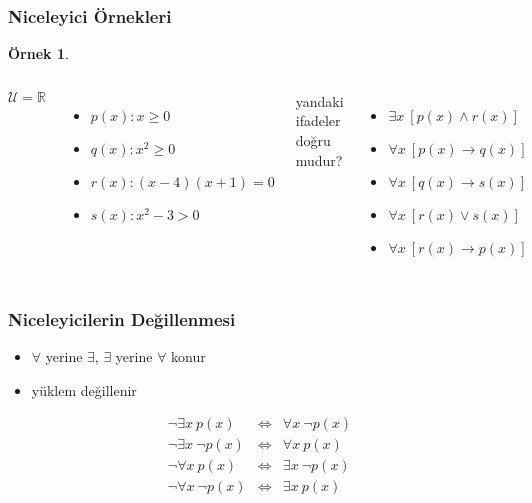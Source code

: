 \documentclass[dvipsnames]{beamer}
\theoremstyle{definition}
\theoremstyle{example}
\newtheorem{ornek}[theorem]{Örnek}
\theoremstyle{plain}
\begin{document}
\begin{frame}
  \frametitle{Niceleyici Örnekleri}

  \begin{ornek}
    \begin{columns}[t]
      $\mathcal{U} = \mathbb{R}$\\

      \begin{itemize}
        \item $p(x): x \geq 0$
        \item $q(x): x^2 \geq 0$
        \item $r(x): (x-4) (x+1) = 0$
        \item $s(x): x^2 -3 > 0$
      \end{itemize}

      yandaki ifadeler doğru mudur?

      \begin{itemize}
        \pause
        \item $\exists x~[p(x) \wedge r(x)]$

        \pause
        \item $\forall x~[p(x) \rightarrow q(x)]$

        \pause
        \item $\forall x~[q(x) \rightarrow s(x)]$

        \pause
        \item $\forall x~[r(x) \vee s(x)]$

        \pause
        \item $\forall x~[r(x) \rightarrow p(x)]$
      \end{itemize}
    \end{columns}
  \end{ornek}
\end{frame}

\begin{frame}
  \frametitle{Niceleyicilerin Değillenmesi}

  \begin{itemize}
    \item $\forall$ yerine $\exists$, $\exists$ yerine $\forall$ konur
    \item yüklem değillenir
  \end{itemize}

  \pause
  \begin{eqnarray*}
    \neg \exists x~p(x)      & \Leftrightarrow & \forall x~\neg p(x)\\
    \neg \exists x~\neg p(x) & \Leftrightarrow & \forall x~p(x)\\
    \neg \forall x~p(x)      & \Leftrightarrow & \exists x~\neg p(x)\\
    \neg \forall x~\neg p(x) & \Leftrightarrow & \exists x~p(x)
  \end{eqnarray*}
\end{frame}
\end{document}
